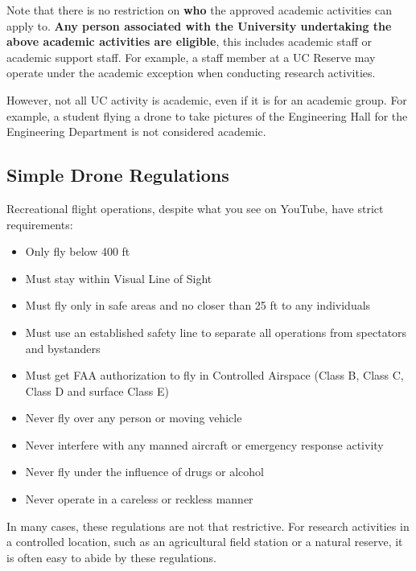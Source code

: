 \documentclass[
  12pt,
]{book}
\providecommand{\tightlist}{%
  \setlength{\itemsep}{0pt}\setlength{\parskip}{0pt}}
\newenvironment{notebox}{
  \definecolor{shadecolor}{gray}{.8}  %
  \color{black}
  \begin{shaded}}
 {\end{shaded}}
\begin{document}
Note that there is no restriction on \textbf{who} the approved academic activities can apply to. \textbf{Any person associated with the University undertaking the above academic activities are eligible}, this includes academic staff or academic support staff. For example, a staff member at a UC Reserve may operate under the academic exception when conducting research activities.

\begin{notebox}
However, not all UC activity is academic, even if it is for an academic group. For example, a student flying a drone to take pictures of the Engineering Hall for the Engineering Department is not considered academic.

\end{notebox}

\hypertarget{simple-drone-regulations}{%
\subsection{Simple Drone Regulations}\label{simple-drone-regulations}}

Recreational flight operations, despite what you see on YouTube, have strict requirements:

\begin{itemize}
\tightlist
\item
  Only fly below 400 ft
\item
  Must stay within Visual Line of Sight
\item
  Must fly only in safe areas and no closer than 25 ft to any individuals
\item
  Must use an established safety line to separate all operations from spectators and bystanders
\item
  Must get FAA authorization to fly in Controlled Airspace (Class B, Class C, Class D and surface Class E)
\item
  Never fly over any person or moving vehicle
\item
  Never interfere with any manned aircraft or emergency response activity
\item
  Never fly under the influence of drugs or alcohol
\item
  Never operate in a careless or reckless manner
\end{itemize}

In many cases, these regulations are not that restrictive. For research activities in a controlled location, such as an agricultural field station or a natural reserve, it is often easy to abide by these regulations.
\end{document}
